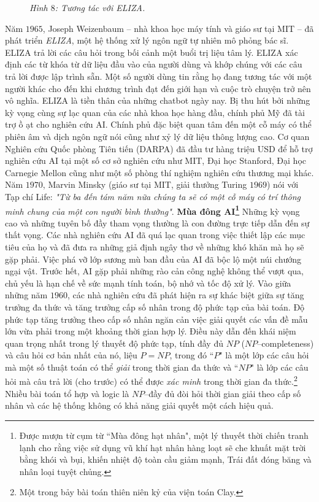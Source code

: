 \begin{multicols}{2}
\begin{figure}[H]
		\caption{\small\textit{\color{cackithi}Hình $8$: Tương tác với ELIZA.}}
		\vspace*{-10pt}
	\end{figure}
	Năm $1965$, Joseph Weizenbaum -- nhà khoa học máy tính và giáo sư tại MIT -- đã phát triển \textit{ELIZA}, một hệ thống xử lý ngôn ngữ tự nhiên mô phỏng bác sĩ. ELIZA trả lời các câu hỏi trong bối cảnh một buổi trị liệu tâm lý. ELIZA xác định các từ khóa từ dữ liệu đầu vào của người dùng và khớp chúng với các câu trả lời được lập trình sẵn. Một số người dùng tin rằng họ đang tương tác với một người khác cho đến khi chương trình đạt đến giới hạn và cuộc trò chuyện trở nên vô nghĩa. ELIZA là tiền thân của những chatbot ngày nay.
	\vskip 0.1cm
	Bị thu hút bởi những kỳ vọng cùng sự lạc quan của các nhà khoa học hàng đầu, chính phủ Mỹ đã tài trợ ồ ạt cho nghiên cứu AI. Chính phủ đặc biệt quan tâm đến một cỗ máy có thể phiên âm và dịch ngôn ngữ nói cũng như xỷ lý dữ liệu thông lượng cao. Cơ quan Nghiên cứu Quốc phòng Tiên tiến (DARPA) đã đầu tư hàng triệu USD để hỗ trợ nghiên cứu AI tại một số cơ sở nghiên cứu như MIT, Đại học Stanford, Đại học Carnegie Mellon cũng như một số phòng thí nghiệm nghiên cứu thương mại khác. Năm $1970$, Marvin Minsky (giáo sư tại MIT, giải thưởng Turing $1969$) nói với Tạp chí Life: \textit{"Từ ba đến tám năm nữa chúng ta sẽ có một cỗ máy có trí thông minh chung của một con người bình thường"}. 
	\vskip 0.1cm
	\textbf{\color{cackithi}Mùa đông AI\footnote{\color{cackithi}Được mượn từ cụm từ ``Mùa đông hạt nhân", một lý thuyết thời chiến tranh lạnh cho rằng việc sử dụng vũ khí hạt nhân hàng loạt sẽ che khuất mặt trời bằng khói và bụi, khiến nhiệt độ toàn cầu giảm mạnh, Trái đất đóng băng và nhân loại tuyệt chủng.}}
	\vskip 0.1cm
	Những kỳ vọng cao và những tuyên bố đầy tham vọng thường là con đường trực tiếp dẫn đến sự thất vọng. Các nhà nghiên cứu AI đã quá lạc quan trong việc thiết lập các mục tiêu của họ và đã đưa ra những giả định ngây thơ về những khó khăn mà họ sẽ gặp phải. Việc phá vỡ lớp sương mù ban đầu của AI đã bộc lộ một núi chướng ngại vật. 
	\vskip 0.1cm
	Trước hết, AI gặp phải những rào cản công nghệ không thể vượt qua, chủ yếu là hạn chế về sức mạnh tính toán, bộ nhớ và tốc độ xử lý. Vào giữa những năm $1960$, các nhà nghiên cứu đã phát hiện ra sự khác biệt giữa sự tăng trưởng đa thức và tăng trưởng cấp số nhân trong độ phức tạp của bài toán. Độ phức tạp tăng trưởng theo cấp số nhân ngăn cản việc giải quyết các vấn đề mẫu lớn vừa phải trong một khoảng thời gian hợp lý. Điều này dẫn đến khái niệm quan trọng nhất trong lý thuyết độ phức tạp, tính đầy đủ $NP$ ($NP$--completeness) và câu hỏi cơ bản nhất của nó, liệu $P = NP$, trong đó ``$P$" là một lớp các câu hỏi mà một số thuật toán có thể \textit{giải} trong thời gian đa thức và ``$NP$" là lớp các câu hỏi mà câu trả lời (cho trước) có thể được \textit{xác minh} trong thời gian đa thức.\footnote{\color{cackithi}Một trong bảy bài toán thiên niên kỷ của viện toán Clay.} Nhiều bài toán tổ hợp và logic là $NP$--đầy đủ đòi hỏi thời gian giải theo cấp số nhân và các hệ thống không có khả năng giải quyết một cách hiệu quả.

\end{multicols}
